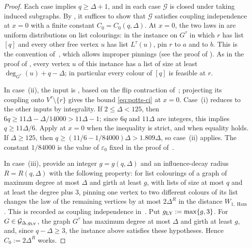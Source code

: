 \documentclass[11pt,reqno]{article}
\theoremstyle{plain}
\theoremstyle{definition}
\theoremstyle{remark}
\theoremstyle{definition}
\theoremstyle{remark}
\newcommand{\eps}{\varepsilon}
\DeclareMathOperator{\Ham}{Ham}
\newcommand{\Deg}{\Delta}                        %
\newcommand{\WHam}{W_{1,\Ham}}                   %
\newcommand{\colours}{[q]}                        %
\newcommand{\Gdegg}[1]{\mathcal{G}_{\Deg,#1}}
\newcommand{\hardlist}[2]{L^{#1}(#2)}
\begin{document}
\begin{proof}
Each case implies \(q\ge\Deg+1\), and in each case \(\mathcal G\) is
closed under taking induced subgraphs.  By ,
it suffices to show that \(\mathcal G\) satisfies coupling independence
at \(x=0\) with a finite constant \(C_0=C_0(q,\Deg)\).  At \(x=0\), the
two laws in  are uniform distributions on list
colourings: in the instance on \(G^\tau\) in which \(r\) has list \(\colours\) and every
other free vertex \(u\) has list \(\hardlist{\tau}{u}\), pin \(r\) to
\(a\) and to \(b\).  This is the convention
of~\cite[Section~2]{CFFGZZ2024}, which allows improper pinnings (see the
proof of ).  As in the proof of
, every vertex \(u\) of this instance has a list of
size at least \(\deg_{G^\tau}(u)+q-\Deg\); in particular every colour
of \(\colours\) is feasible at \(r\).

In case~\textup{(ii)}, the input is \cite[Theorem~20]{CFFGZZ2024},
based on the flip contraction of~\cite{CarlsonVigoda2024}; projecting
its coupling onto \(V^\tau\setminus\{r\}\) gives the bound
\eqref{eq:potts-ci} at \(x=0\).  Case~\textup{(i)} reduces to the other inputs by
integrality.  If \(2\le\Deg<125\), then
\(6q\ge11\Deg-\Deg/14000>11\Deg-1\); since \(6q\) and \(11\Deg\) are
integers, this implies \(q\ge11\Deg/6\).  Apply  at
\(x=0\) when the inequality is strict, and
 when equality holds.  If \(\Deg\ge125\),
then \(q\ge(11/6-1/84000)\Deg>1.809\Deg\), so case~\textup{(ii)}
applies.  The constant \(1/84000\) is the value of
\(\eps_0\) fixed in the proof of~\cite[Theorem~5.1]{CDMPP2019}.

In case~\textup{(iii)}, \cite[Theorem~5.10 and Lemmas~5.13
and~5.14]{CLMM2023} provide an integer \(g=g(q,\Deg)\) and an
influence-decay radius \(R=R(q,\Deg)\) with the
following property: for list colourings of a graph of maximum degree at
most \(\Deg\) and girth at least \(g\), with lists of size at most \(q\)
and at least the degree plus \(3\), pinning one vertex to two different
colours of its list changes the law of the remaining vertices by at most
\(2\Deg^{R}\) in the distance \(\WHam\).  This is recorded as
coupling independence in~\cite[Section~4]{CFFGZZ2024}.  Put
\(g_{\rm LY}:=\max\{g,3\}\).  For \(G\in\Gdegg{g_{\rm LY}}\), the graph
\(G^\tau\) has maximum degree at most \(\Deg\) and girth at least
\(g\), and, since \(q-\Deg\ge3\), the instance above satisfies these
hypotheses.  Hence \(C_0:=2\Deg^{R}\) works.
\end{proof}
\end{document}
